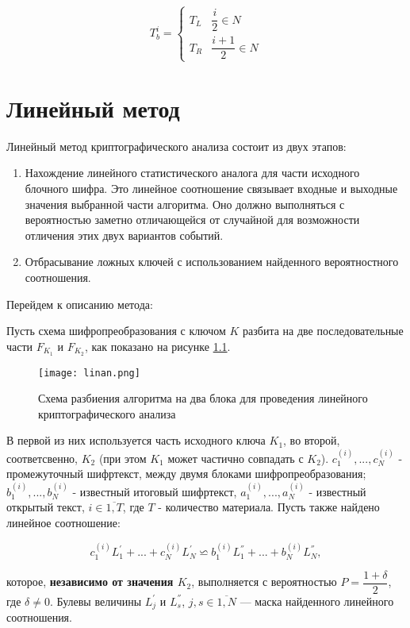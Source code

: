 \documentclass[utf8x, 14pt]{G7-32} %
\begin{document}
$$ T_b^i =
\begin{cases}
T_L & \dfrac{i}{2} \in N \\
T_R & \dfrac{i+1}{2} \in N
\end{cases} $$

\chapter{Линейный метод}

Линейный метод криптографического анализа состоит из двух этапов: 
\begin{enumerate}
    \item Нахождение линейного статистического аналога для части исходного блочного шифра. Это линейное соотношение связывает входные и выходные значения выбранной части алгоритма. Оно должно выполняться с вероятностью заметно отличающейся от случайной для возможности отличения этих двух вариантов событий.
    \item Отбрасывание ложных ключей с использованием найденного вероятностного соотношения.
\end{enumerate}

Перейдем к описанию метода:

Пусть схема шифропреобразования с ключом $K$ разбита на две последовательные части $F_{K_1}$ и $F_{K_2}$, как показано на рисунке \ref{fig:linan}. 
\begin{figure}[h!]
	\centering
	\texttt{[image: linan.png]}
	\caption{Схема разбиения алгоритма на два блока для проведения линейного криптографического анализа}
	\label{fig:linan}
\end{figure}
В первой из них используется часть исходного ключа $K_1$, во второй, соответсвенно, $K_2$ (при этом $K_1$ может частично совпадать с $K_2$). $c_1^{(i)}, ..., c_N^{(i)}$  - промежуточный шифртекст, между двумя блоками шифропреобразования; $b_1^{(i)}, ..., b_N^{(i)}$ - известный итоговый шифртекст, $a_1^{(i)}, ..., a_N^{(i)}$ - известный открытый текст, $i \in \overline{1,T}$, где $T$ - количество материала. Пусть также найдено линейное соотношение:

\begin{equation}
\label{eqn:eq1}
c_1^{(i)} L_1^{'} + ... + c_N^{(i)} L_N^{'} \backsimeq b_1^{(i)} L_1^{''} + ... + b_N^{(i)} L_N^{''} ,\end{equation}

 которое, \textbf{независимо от значения $K_2$}, выполняется с вероятностью $P = \dfrac{1+\delta}{2}$, где $\delta \neq 0$. Булевы величины $L_j^{'}$ и $L_s^{''}$, $j,s \in \overline{1,N}$ --- маска найденного линейного соотношения.
\end{document}
